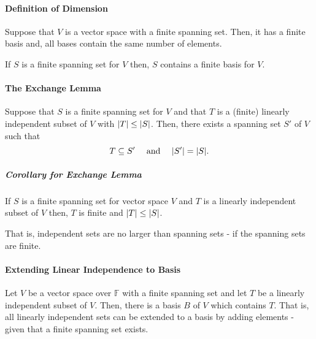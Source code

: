 \paragraph{Definition of Dimension}
Suppose that \(V\) is a vector space with a finite spanning set. Then,
it has a finite basis and, all bases contain the same number of elements.

If \(S\) is a finite spanning set for \(V\) then, \(S\)
contains a finite basis for \(V\).

\paragraph{The Exchange Lemma}
Suppose that \(S\) is a finite spanning set for \(V\) and that \(T\)
is a (finite) linearly independent subset of \(V\) with
\(\abs{T} \leq \abs{S}\).
Then, there exists a spanning set \(S'\) of \(V\)
such that
\[
    T \subseteq S' \quad\text{ and }\quad \abs{S'} = \abs{S}.
\]

\subparagraph{Corollary for Exchange Lemma}
If \(S\) is a finite spanning set for vector space \(V\) and
\(T\) is a linearly independent subset of \(V\) then,
\(T\) is finite and \(\abs{T} \leq \abs{S}\).

That is, independent sets are no larger than spanning sets - if the
spanning sets are finite.

\paragraph{Extending Linear Independence to Basis}
Let \(V\) be a vector space over \(\mathbb{F}\) with a finite spanning set
and let \(T\) be a linearly independent subset of \(V\).
Then, there is a basis \(B\) of \(V\) which contains \(T\).
That is, all linearly independent sets can be extended to a basis by adding
elements - given that a finite spanning set exists.
